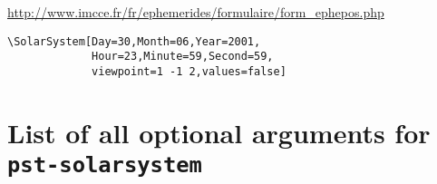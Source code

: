 \documentclass[11pt,english,BCOR10mm,DIV12,bibliography=totoc,parskip=false,
   smallheadings, headexclude,footexclude,oneside]{pst-doc}
\begin{document}
\url{http://www.imcce.fr/fr/ephemerides/formulaire/form_ephepos.php}
\begin{center}
\SolarSystem

\SolarSystem[Day=30,Month=06,Year=2001,Hour=23,Minute=59,Second=59,viewpoint=1 -1 2,values=false]
\end{center}


\begin{verbatim}
\SolarSystem[Day=30,Month=06,Year=2001,
             Hour=23,Minute=59,Second=59,
             viewpoint=1 -1 2,values=false]
\end{verbatim}


\clearpage
\section{List of all optional arguments for \texttt{pst-solarsystem}}





\bgroup
\raggedright
\nocite{*}


\egroup

\printindex
\end{document}
